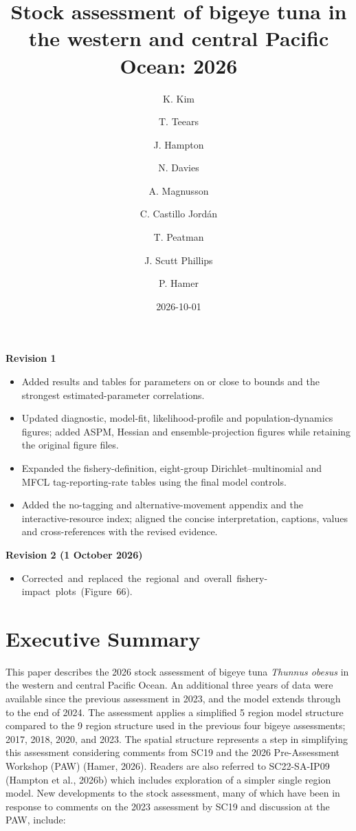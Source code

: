 \documentclass[
  english,
  a4paper,
  a4paper,
  11pt]{SCreport}
\title{Stock assessment of bigeye tuna in the western and central
Pacific Ocean: 2026}
\author{K. Kim \and T. Teears \and J. Hampton \and N. Davies \and A.
Magnusson \and C. Castillo Jordán \and T. Peatman \and J. Scutt
Phillips \and P. Hamer}
\date{2026-10-01}
\newif\ifisolatefigures
\newif\ifreportfirstfigure
\renewcommand{\maketitle}{\setcounter{footnote}{4}\global\isolatefigurestrue\global\reportfirstfiguretrue}
\renewcommand*\contentsname{Table of contents}
\newcommand\contentsname{Table of contents}
\begin{document}
\maketitle

\textbf{Revision 1}

\begin{itemize}
  \item Added results and tables for parameters on or close to bounds and the strongest estimated-parameter correlations.
  \item Updated diagnostic, model-fit, likelihood-profile and population-dynamics figures; added ASPM, Hessian and ensemble-projection figures while retaining the original figure files.
  \item Expanded the fishery-definition, eight-group Dirichlet--multinomial and MFCL tag-reporting-rate tables using the final model controls.
  \item Added the no-tagging and alternative-movement appendix and the interactive-resource index; aligned the concise interpretation, captions, values and cross-references with the revised evidence.
\end{itemize}

\bigskip
\textbf{Revision 2 (1 October 2026)}

\begin{itemize}
  \item \mbox{Corrected and replaced the regional and overall fishery-impact plots (Figure 66).}
\end{itemize}

\clearpage

\renewcommand*\contentsname{Table of contents}
{
\setcounter{tocdepth}{3}
\tableofcontents
}

\clearpage

\section{Executive Summary}\label{executive-summary}

This paper describes the 2026 stock assessment of bigeye tuna
\emph{Thunnus obesus} in the western and central Pacific Ocean. An
additional three years of data were available since the previous
assessment in 2023, and the model extends through to the end of 2024.
The assessment applies a simplified 5 region model structure compared to
the 9 region structure used in the previous four bigeye assessments;
2017, 2018, 2020, and 2023. The spatial structure represents a step in
simplifying this assessment considering comments from SC19 and the 2026
Pre-Assessment Workshop (PAW) (Hamer, 2026). Readers are also referred
to SC22-SA-IP09 (Hampton et al., 2026b) which includes exploration of a
simpler single region model. New developments to the stock assessment,
many of which have been in response to comments on the 2023 assessment
by SC19 and discussion at the PAW, include:
\end{document}
